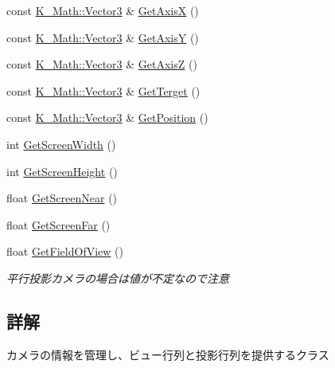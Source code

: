 \begin{DoxyCompactItemize}
const \mbox{\hyperlink{namespace_k___math_a66884d78082c39ada4091c211f3570f8}{K\+\_\+\+Math\+::\+Vector3}} \& \mbox{\hyperlink{class_k___graphics_1_1_camera_class_a7ed2ff417ce65d309fb37fdce4805ed1}{Get\+AxisX}} ()
\item 
const \mbox{\hyperlink{namespace_k___math_a66884d78082c39ada4091c211f3570f8}{K\+\_\+\+Math\+::\+Vector3}} \& \mbox{\hyperlink{class_k___graphics_1_1_camera_class_ad66d73d5ab556f074f5d8d082b040f49}{Get\+AxisY}} ()
\item 
const \mbox{\hyperlink{namespace_k___math_a66884d78082c39ada4091c211f3570f8}{K\+\_\+\+Math\+::\+Vector3}} \& \mbox{\hyperlink{class_k___graphics_1_1_camera_class_af7a6866617e0e004b95a6dd33c4396b1}{Get\+AxisZ}} ()
\item 
const \mbox{\hyperlink{namespace_k___math_a66884d78082c39ada4091c211f3570f8}{K\+\_\+\+Math\+::\+Vector3}} \& \mbox{\hyperlink{class_k___graphics_1_1_camera_class_a681845d905fef611bbc88474bc145cdc}{Get\+Terget}} ()
\item 
const \mbox{\hyperlink{namespace_k___math_a66884d78082c39ada4091c211f3570f8}{K\+\_\+\+Math\+::\+Vector3}} \& \mbox{\hyperlink{class_k___graphics_1_1_camera_class_a8ff01ed106d9ee0ac2a6baed8530fa34}{Get\+Position}} ()
\item 
int \mbox{\hyperlink{class_k___graphics_1_1_camera_class_af395ed2ac8596700200324379b38e2f1}{Get\+Screen\+Width}} ()
\item 
int \mbox{\hyperlink{class_k___graphics_1_1_camera_class_a62cca8a08a917056082dacc1f56d05ba}{Get\+Screen\+Height}} ()
\item 
float \mbox{\hyperlink{class_k___graphics_1_1_camera_class_a6d7954b3e2c543b10ccbbca7228f4435}{Get\+Screen\+Near}} ()
\item 
float \mbox{\hyperlink{class_k___graphics_1_1_camera_class_ad7b0263ca8ed5d8b36adda3d9209600d}{Get\+Screen\+Far}} ()
\item 
float \mbox{\hyperlink{class_k___graphics_1_1_camera_class_ae9b70a2f55f2784e14630ae221bcc386}{Get\+Field\+Of\+View}} ()
\begin{DoxyCompactList}\small\item\em 平行投影カメラの場合は値が不定なので注意 \end{DoxyCompactList}\end{DoxyCompactItemize}


\subsection{詳解}
カメラの情報を管理し、ビュー行列と投影行列を提供するクラス 

